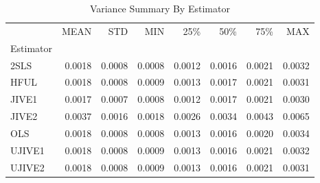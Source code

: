 \begin{table}[ht]
\centering
\caption{Variance Summary By Estimator}
\begin{tabular}{lrrrrrrr}
\toprule
 & MEAN & STD & MIN & 25\% & 50\% & 75\% & MAX \\
Estimator &  &  &  &  &  &  &  \\
\midrule
2SLS & 0.0018 & 0.0008 & 0.0008 & 0.0012 & 0.0016 & 0.0021 & 0.0032 \\
HFUL & 0.0018 & 0.0008 & 0.0009 & 0.0013 & 0.0017 & 0.0021 & 0.0031 \\
JIVE1 & 0.0017 & 0.0007 & 0.0008 & 0.0012 & 0.0017 & 0.0021 & 0.0030 \\
JIVE2 & 0.0037 & 0.0016 & 0.0018 & 0.0026 & 0.0034 & 0.0043 & 0.0065 \\
OLS & 0.0018 & 0.0008 & 0.0008 & 0.0013 & 0.0016 & 0.0020 & 0.0034 \\
UJIVE1 & 0.0018 & 0.0008 & 0.0009 & 0.0013 & 0.0016 & 0.0021 & 0.0032 \\
UJIVE2 & 0.0018 & 0.0008 & 0.0009 & 0.0013 & 0.0016 & 0.0021 & 0.0031 \\
\bottomrule
\end{tabular}
\end{table}
